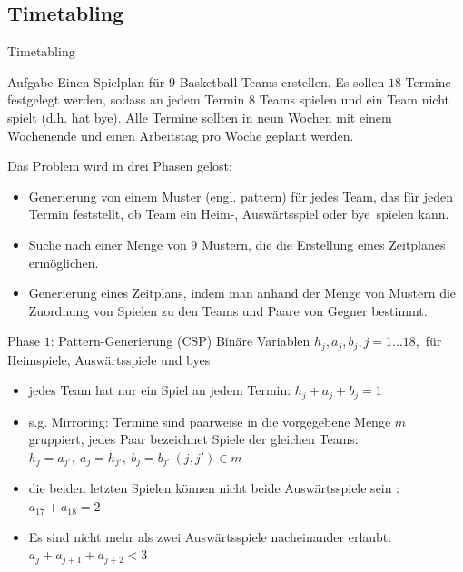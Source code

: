 \documentclass[hyperref={pdfpagelabels=false}]{beamer}
\begin{document}
\subsection{Timetabling}
\begin{frame}[allowframebreaks]{Timetabling}
\nocite{Timetabling}
\small

\begin{block}{Aufgabe}
Einen Spielplan für $9$ Basketball-Teams erstellen. Es sollen $18$ Termine festgelegt werden, sodass an jedem Termin $8$ Teams spielen und ein Team nicht spielt (d.h. hat \glqq bye\grqq). Alle Termine sollten in neun Wochen mit einem Wochenende und einen Arbeitstag pro Woche geplant werden.
\end{block}

\newpage

Das Problem wird in drei Phasen gelöst: \begin{itemize}
\setlength{\itemsep}{0pt}
\item Generierung von einem Muster (engl. pattern) für jedes Team, das für jeden Termin feststellt, ob Team ein Heim-, Auswärtsspiel oder \glqq bye\grqq\ spielen kann. 
\item Suche nach einer Menge von $9$ Mustern, die die Erstellung eines Zeitplanes ermöglichen.
\item Generierung eines Zeitplans, indem man anhand der Menge von Mustern die Zuordnung von Spielen zu den Teams und Paare von Gegner bestimmt.
\end{itemize}

\newpage

\begin{block}{Phase $1$: Pattern-Generierung (CSP)}
Binäre Variablen $h_j, a_j, b_j, j=1\dots 18,$ für Heimspiele, Auswärtsspiele und byes 
\begin{itemize}
\setlength{\itemsep}{0pt}
\item jedes Team hat nur ein Spiel an jedem Termin: $h_j+a_j+b_j = 1$

\item s.g. Mirroring: Termine sind paarweise in die vorgegebene Menge $m$ gruppiert, jedes Paar bezeichnet Spiele der gleichen Teams: $h_j=a_{j'},\ a_j=h_{j'},\ b_j=b_{j'}\ (j, j')\in m$

\item die beiden letzten Spielen können nicht beide Auswärtsspiele sein : $a_{17}+a_{18} = 2$

\item Es sind nicht mehr als zwei Auswärtsspiele nacheinander erlaubt:\\ $a_j+a_{j+1}+a_{j+2}<3$ 


\end{itemize}
\end{block}
\end{frame}
\end{document}
